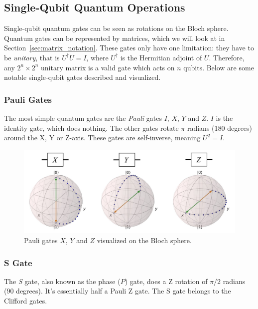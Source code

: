 \documentclass[11pt]{article}
\begin{document}
\subsection{Single-Qubit Quantum Operations}
Single-qubit quantum gates can be seen as rotations on the Bloch sphere. Quantum gates can be represented by matrices, which we will look at in Section~\ref{sec:matrix_notation}. These gates only have one limitation: they have to be \emph{unitary}, that is $U^\dagger U = I$, where $U^\dagger$ is the Hermitian adjoint of $U$. Therefore, any $2^n \times 2^n$ unitary matrix is a valid gate which acts on $n$ qubits. Below are some notable single-qubit gates described and visualized.

\subsubsection{Pauli Gates}
 The most simple quantum gates are the \emph{Pauli} gates $I$, $X$, $Y$ and $Z$. $I$ is the identity gate, which does nothing. The other gates rotate $\pi$ radians (180 degrees) around the X, Y or Z-axis. These gates are self-inverse, meaning $U^2 = I$.

\begin{figure}[ht]
  \begin{adjustwidth}{-2.5cm}{-2.5cm}
  \centering
  \includegraphics[scale=0.25]{images/pauli_gates.eps}
  \caption{Pauli gates $X$, $Y$ and $Z$ visualized on the Bloch sphere.}
  \end{adjustwidth}
\end{figure}


\subsubsection{S Gate}
The \emph{S} gate, also known as the phase ($P$) gate, does a Z rotation of $\pi/2$ radians (90 degrees). It's essentially half a Pauli Z gate. The S gate belongs to the Clifford gates.
\end{document}
